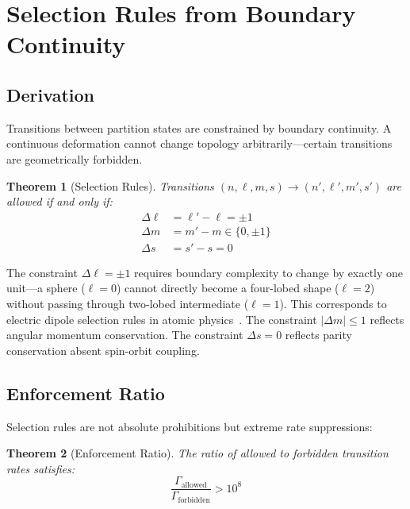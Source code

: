 \documentclass[twocolumn,aps,prb,superscriptaddress,longbibliography,floatfix]{revtex4-2}
\newtheorem{theorem}{Theorem}[section]
\theoremstyle{remark}
\begin{document}
\section{Selection Rules from Boundary Continuity}
\label{sec:selection}

\subsection{Derivation}

Transitions between partition states are constrained by boundary
continuity. A continuous deformation cannot change topology
arbitrarily---certain transitions are geometrically forbidden.

\begin{theorem}[Selection Rules]
\label{thm:selection}
Transitions $(n, \ell, m, s) \to (n', \ell', m', s')$ are allowed if and
only if:
\begin{align}
\Delta \ell &= \ell' - \ell = \pm 1 \label{eq:sel_l} \\
\Delta m &= m' - m \in \{0, \pm 1\} \label{eq:sel_m} \\
\Delta s &= s' - s = 0 \label{eq:sel_s}
\end{align}
\end{theorem}

The constraint $\Delta \ell = \pm 1$ requires boundary complexity to
change by exactly one unit---a sphere ($\ell=0$) cannot directly become a
four-lobed shape ($\ell=2$) without passing through two-lobed intermediate
($\ell=1$). This corresponds to electric dipole selection rules in atomic
physics~\cite{Sakurai2017}. The constraint $|\Delta m| \leq 1$ reflects
angular momentum conservation. The constraint $\Delta s = 0$ reflects
parity conservation absent spin-orbit coupling.

\subsection{Enforcement Ratio}

Selection rules are not absolute prohibitions but extreme rate
suppressions:

\begin{theorem}[Enforcement Ratio]
\label{thm:enforcement}
The ratio of allowed to forbidden transition rates satisfies:
\begin{equation}
\frac{\Gamma_\text{allowed}}{\Gamma_\text{forbidden}} > 10^8
\label{eq:enforcement}
\end{equation}
\end{theorem}
\end{document}
